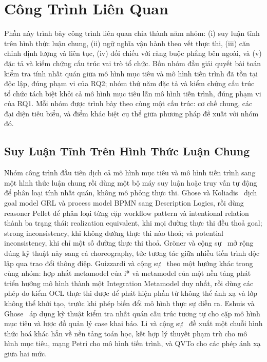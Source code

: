 \section{Công Trình Liên Quan}\label{sec:related-work}

Phần này trình bày công trình liên quan chia thành năm nhóm: (i) suy luận tĩnh trên hình thức luận
chung, (ii) ngữ nghĩa vận hành theo vết thực thi, (iii) căn chỉnh định lượng và liên tục, (iv) đối
chiếu với ràng buộc phẳng bên ngoài, và (v) đặc tả và kiểm chứng cấu trúc vai trò tổ chức. Bốn nhóm
đầu giải quyết bài toán kiểm tra tính nhất quán giữa mô hình mục tiêu và mô hình tiến trình đã tồn
tại độc lập, đúng phạm vi của RQ2; nhóm thứ năm đặc tả và kiểm chứng cấu trúc tổ chức tách biệt khỏi
cả mô hình mục tiêu lẫn mô hình tiến trình, đúng phạm vi của RQ1. Mỗi nhóm được trình bày theo cùng
một cấu trúc: cơ chế chung, các đại diện tiêu biểu, và điểm khác biệt cụ thể giữa phương pháp đề
xuất với nhóm đó.

\subsection{Suy Luận Tĩnh Trên Hình Thức Luận Chung}\label{sec:rw-static}

Nhóm công trình đầu tiên dịch cả mô hình mục tiêu và mô hình tiến trình sang một hình thức luận
chung rồi dùng một bộ máy suy luận hoặc truy vấn tự động để phân loại tính nhất quán, không mô phỏng
thực thi. Ghose và Koliadis~\cite{ghose2007validation} dịch goal model GRL và process model BPMN
sang Description Logics, rồi dùng reasoner Pellet để phân loại từng cặp workflow pattern và
intentional relation thành ba trạng thái: realization equivalent, khi mọi đường thực thi đều thoả
goal; strong inconsistency, khi không đường thực thi nào thoả; và potential inconsistency, khi chỉ
một số đường thực thi thoả. Gröner và cộng sự~\cite{groner2014vadl} mở rộng đúng kỹ thuật này sang
cả choreography, tức tương tác giữa nhiều tiến trình độc lập qua trao đổi thông điệp. Guizzardi và
cộng sự~\cite{guizzardi2014vemi} theo một hướng khác trong cùng nhóm: hợp nhất metamodel của i* và
metamodel của một nền tảng phát triển hướng mô hình thành một Integration Metamodel duy nhất, rồi
dùng các phép đo kiểm OCL thực thi được để phát hiện phần tử không thể ánh xạ và lớp không thể khởi
tạo, trước khi phép biến đổi mô hình thực sự diễn ra. Eshuis và Ghose~\cite{eshuis2021consistency} áp
dụng kỹ thuật kiểm tra nhất quán cấu trúc tương tự cho cặp mô hình mục tiêu và lược đồ quản lý case
khai báo. Li và cộng sự~\cite{li2015cim} đề xuất một chuỗi hình thức hoá khác hẳn về nền tảng toán
học, kết hợp lý thuyết phạm trù cho mô hình mục tiêu, mạng Petri cho mô hình tiến trình, và QVTo cho
các phép ánh xạ giữa hai mức.

